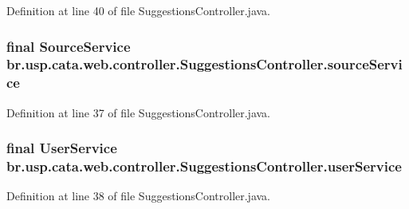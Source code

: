 Definition at line 40 of file Suggestions\+Controller.\+java.

\hypertarget{classbr_1_1usp_1_1cata_1_1web_1_1controller_1_1_suggestions_controller_afb0a528cde713db192026ca71622462c}{
\subsubsection[{source\+Service}]{\setlength{\rightskip}{0pt plus 5cm}final {\bf Source\+Service} br.\+usp.\+cata.\+web.\+controller.\+Suggestions\+Controller.\+source\+Service\hspace{0.3cm}{\ttfamily [private]}}}\label{classbr_1_1usp_1_1cata_1_1web_1_1controller_1_1_suggestions_controller_afb0a528cde713db192026ca71622462c}


Definition at line 37 of file Suggestions\+Controller.\+java.

\hypertarget{classbr_1_1usp_1_1cata_1_1web_1_1controller_1_1_suggestions_controller_a51d45abbc26a3f63957ca2da9da24252}{
\subsubsection[{user\+Service}]{\setlength{\rightskip}{0pt plus 5cm}final {\bf User\+Service} br.\+usp.\+cata.\+web.\+controller.\+Suggestions\+Controller.\+user\+Service\hspace{0.3cm}{\ttfamily [private]}}}\label{classbr_1_1usp_1_1cata_1_1web_1_1controller_1_1_suggestions_controller_a51d45abbc26a3f63957ca2da9da24252}


Definition at line 38 of file Suggestions\+Controller.\+java.

